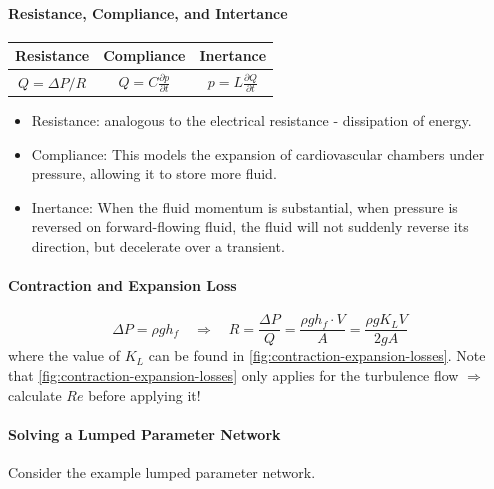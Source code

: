 \documentclass[a4paper]{article}
\begin{document}
\paragraph{Resistance, Compliance, and Intertance}
\begin{center}
    \begin{tabular}{ccc}
    \toprule
        Resistance & Compliance & Inertance  \\ [.2em]
    \midrule
        $Q = \Delta P / R$ & $\displaystyle Q = C \frac{\partial p}{\partial t}$ & $\displaystyle p = L \frac{\partial Q}{\partial t}$ \\ [.2em]
    \bottomrule
    \end{tabular}
\end{center}
\begin{itemize}
    \item Resistance: analogous to the electrical resistance - dissipation of energy.
    \item Compliance: This models the expansion of cardiovascular chambers under pressure, allowing it to store more fluid.
    \item Inertance: When the fluid momentum is substantial, when pressure is reversed on forward-flowing fluid, the fluid will not suddenly reverse its direction, but decelerate over a transient.
\end{itemize}


\paragraph{Contraction and Expansion Loss}

\[
    \Delta P = \rho g h_{f}  \quad \Rightarrow \quad R = \frac{\Delta P}{Q} = \frac{\rho g h_{f} \cdot V}{A} = \frac{\rho g K_L V}{2gA}
\]
where the value of $K_L$ can be found in \autoref{fig:contraction-expansion-losses}. Note that \autoref{fig:contraction-expansion-losses} only applies for the turbulence flow $\Rightarrow$ calculate $Re$ before applying it!

\paragraph{Solving a Lumped Parameter Network} Consider the example lumped parameter network. \\
\end{document}
